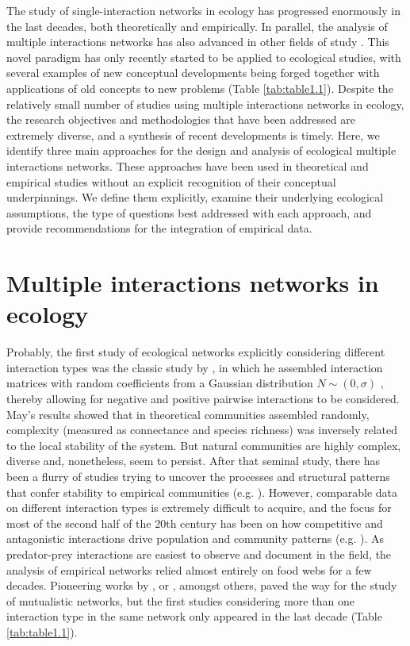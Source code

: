 The study of single-interaction networks in ecology has progressed enormously in the last decades, both theoretically and empirically. In parallel, the analysis of multiple interactions networks has also advanced in other fields of study \citep{Boccaletti2014}. This novel paradigm has only recently started to be applied to ecological studies, with several examples of new conceptual developments being forged together with applications of old concepts to new problems (Table \ref{tab:table1.1}). Despite the relatively small number of studies using multiple interactions networks in ecology, the research objectives and methodologies that have been addressed are extremely diverse, and a synthesis of recent developments is timely. Here, we identify three main approaches for the design and analysis of ecological multiple interactions networks. These approaches have been used in theoretical and empirical studies without an explicit recognition of their conceptual underpinnings. We define them explicitly, examine their underlying ecological assumptions, the type of questions best addressed with each approach, and provide recommendations for the integration of empirical data.

\section{Multiple interactions networks in ecology}
Probably, the first study of ecological networks explicitly considering different interaction types was the classic study by \cite{May1972}, in which he assembled interaction matrices with random coefficients from a Gaussian distribution  $N{\sim}\left(0,\sigma \right)$  , thereby allowing for negative and positive pairwise interactions to be considered. May's results showed that in theoretical communities assembled randomly, complexity (measured as connectance and species richness) was inversely related to the local stability of the system. But natural communities are highly complex, diverse and, nonetheless, seem to persist. After that seminal study, there has been a flurry of studies trying to uncover the processes and structural patterns that confer stability to empirical communities (e.g. \citealt{Saint-Beat2015}). However, comparable data on different interaction types is extremely difficult to acquire, and the focus for most of the second half of the 20th century has been on how competitive and antagonistic interactions drive population and community patterns (e.g. \citealt{Connell1961, Paine1966}). As predator-prey interactions are easiest to observe and document in the field, the analysis of empirical networks relied almost entirely on food webs for a few decades. Pioneering works by \cite{Jordano1987}, or \cite{Fonseca1996}, amongst others, paved the way for the study of mutualistic networks, but the first studies considering more than one interaction type in the same network only appeared in the last decade (Table \ref{tab:table1.1}).

